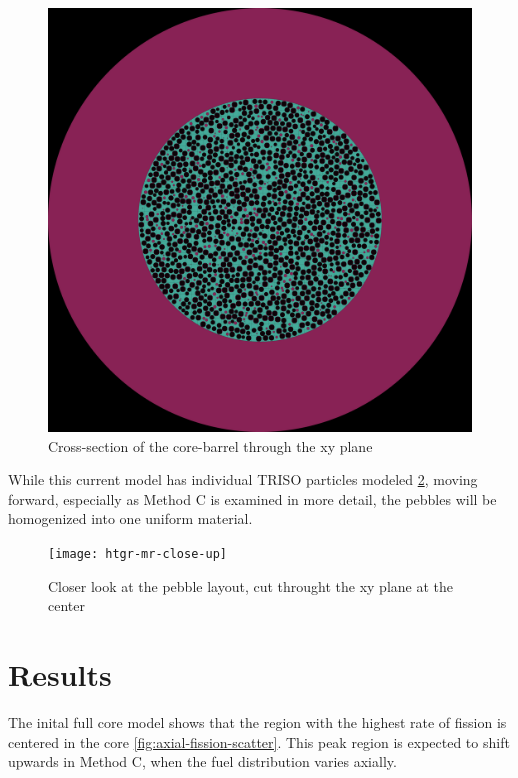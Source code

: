 \documentclass{anstrans}
\begin{document}
\begin{figure}[H]
  \centering
  \includegraphics[width = \linewidth]{htgr-mr-full-core-radial}
  \caption{Cross-section of the core-barrel through the xy plane}
  \label{fig:radial-xs}
\end{figure}

While this current model has individual TRISO particles modeled \ref{fig:radial-zoom}, moving forward, especially as Method C is examined in more detail, the pebbles will be homogenized into one uniform material.

\begin{figure}[H]
  \centering
  \texttt{[image: htgr-mr-close-up]}
  \caption{Closer look at the pebble layout, cut throught the xy plane at the center}
  \label{fig:radial-zoom}
\end{figure}

\section{Results}

The inital full core model shows that the region with the highest rate of fission is centered in the core \ref{fig:axial-fission-scatter}.  This peak region is expected to shift upwards in Method C, when the fuel distribution varies axially.
\end{document}
